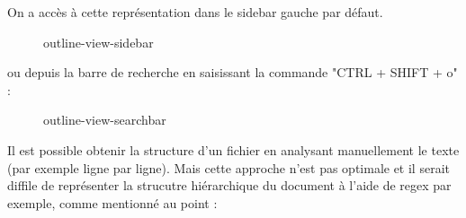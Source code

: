 \documentclass[
    iict, %
    il, %
]{heig-tb}
\begin{document}
On a accès à cette représentation dans le sidebar gauche par défaut.

\begin{figure}[!h]
    \begin{center}
    \end{center}
    \caption[outline-view-sidebar]{\label{outline-view-sidebar} outline-view-sidebar}
\end{figure}

ou depuis la barre de recherche en saisissant la commande "CTRL + SHIFT + o" :

\begin{figure}[!h]
    \begin{center}
    \end{center}
    \caption[outline-view-searchbar]{\label{outline-view-searchbar} outline-view-searchbar}
\end{figure}

Il est possible obtenir la structure d'un fichier en analysant manuellement le texte (par exemple ligne par ligne).
Mais cette approche n'est pas optimale et il serait diffile de représenter la strucutre hiérarchique du document à l'aide de regex par exemple,
comme mentionné au point : %
\end{document}
